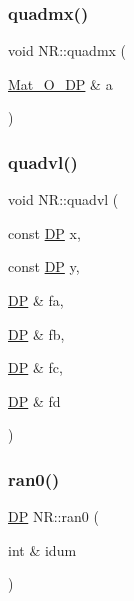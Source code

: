 \mbox{\label{namespaceNR_a4fb019bb24b7e09bb9a1198ca1c679b4}} 
\subsubsection{\texorpdfstring{quadmx()}{quadmx()}}
{\footnotesize\ttfamily void N\+R\+::quadmx (\begin{DoxyParamCaption}\item[{\mbox{\hyperlink{namespaceNR_adc1f8da33094b6bbeb1f5f899515ce54}{Mat\+\_\+\+O\+\_\+\+DP}} \&}]{a }\end{DoxyParamCaption})}

\mbox{\label{namespaceNR_a819df1d348b859d09568c5b871dc40e1}} 
\subsubsection{\texorpdfstring{quadvl()}{quadvl()}}
{\footnotesize\ttfamily void N\+R\+::quadvl (\begin{DoxyParamCaption}\item[{const \mbox{\hyperlink{namespaceNR_af6ff762dd605ff477b8e52387253a02a}{DP}}}]{x,  }\item[{const \mbox{\hyperlink{namespaceNR_af6ff762dd605ff477b8e52387253a02a}{DP}}}]{y,  }\item[{\mbox{\hyperlink{namespaceNR_af6ff762dd605ff477b8e52387253a02a}{DP}} \&}]{fa,  }\item[{\mbox{\hyperlink{namespaceNR_af6ff762dd605ff477b8e52387253a02a}{DP}} \&}]{fb,  }\item[{\mbox{\hyperlink{namespaceNR_af6ff762dd605ff477b8e52387253a02a}{DP}} \&}]{fc,  }\item[{\mbox{\hyperlink{namespaceNR_af6ff762dd605ff477b8e52387253a02a}{DP}} \&}]{fd }\end{DoxyParamCaption})}

\mbox{\label{namespaceNR_a51fab0252d34144103c74d4f947e86c1}} 
\subsubsection{\texorpdfstring{ran0()}{ran0()}}
{\footnotesize\ttfamily \mbox{\hyperlink{namespaceNR_af6ff762dd605ff477b8e52387253a02a}{DP}} N\+R\+::ran0 (\begin{DoxyParamCaption}\item[{int \&}]{idum }\end{DoxyParamCaption})}


